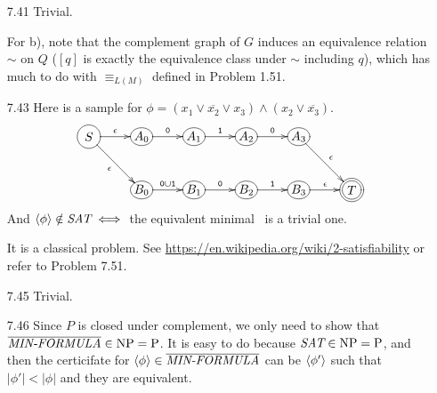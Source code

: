 \begin{itemize}
	\item[\Star 7.40] 
	\Omit
	
	\item[7.41]
	Trivial.
	
	\item[\Star 7.42]
	For b), note that the complement graph of $G$ induces an equivalence relation $\sim$ on $Q$ ($[q]$ is exactly the equivalence class under $\sim$ including $q$), which has much to do with $\equiv_{L(M)}$ defined in Problem 1.51.
	
	\item[7.43]
	Here is a sample for $\phi = (x_1 \vee \overline{x_2} \vee x_3) \wedge (x_2 \vee \overline{x_3})$.
	$$
	\xymatrix@R=2pc@C=2pc{
		*+<1pc>[o][F-]{S} \ar[r]^{\epsilon} \ar[rd]_{\epsilon} & 
		*+[o][F-]{A_0} \ar[r]^{\TT{0}} & 
		*+[o][F-]{A_1} \ar[r]^{\TT{1}} & 
		*+[o][F-]{A_2} \ar[r]^{\TT{0}} &
		*+[o][F-]{A_3} \ar[rd]^{\epsilon} \\ & 
		*+[o][F-]{B_0} \ar[r]^{\TT{0} \cup \TT{1}} & 
		*+[o][F-]{B_1} \ar[r]^{\TT{0}} & 
		*+[o][F-]{B_2} \ar[r]^{\TT{1}} &
		*+[o][F-]{B_3} \ar[r]^{\epsilon} &
		*+<1pc>[o][F=]{T}
	}
	$$
	And $\Bra{\phi} \notin \IT{SAT} \iff $ the equivalent minimal \NFA\ is a trivial one.
	
	\item[\Star 7.44]
	It is a classical problem. See \url{https://en.wikipedia.org/wiki/2-satisfiability} or refer to Problem 7.51.
	
	\item[7.45]
	Trivial.
	
	\item[7.46]
	Since $P$ is closed under complement, we only need to show that $\overline{\IT{MIN-FORMULA}} \in \NPoly = \Poly$. It is easy to do because $\IT{SAT} \in \NPoly = \Poly$, and then the certicifate for $\Bra{\phi} \in \overline{\IT{MIN-FORMULA}}$ can be $\Bra{\phi'}$ such that $|\phi'| < |\phi|$ and they are equivalent.
	
\end{itemize}
